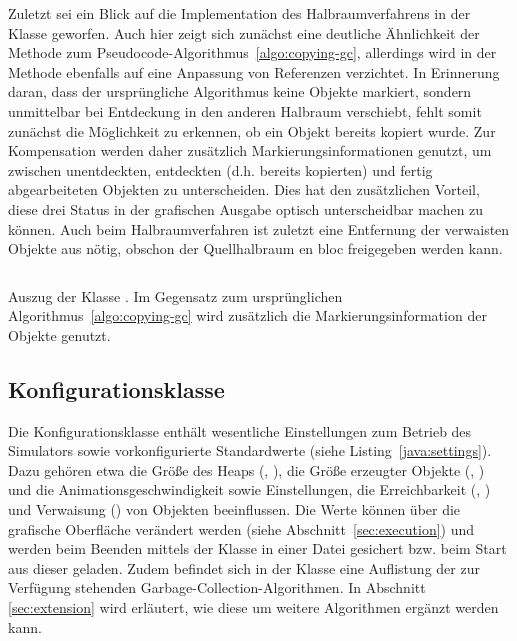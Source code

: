 Zuletzt sei ein Blick auf die Implementation des Halbraumverfahrens in der Klasse  geworfen.
Auch hier zeigt sich zunächst eine deutliche Ähnlichkeit der Methode  zum Pseudocode-Algorithmus~\ref{algo:copying-gc}, allerdings wird in der Methode  ebenfalls auf eine Anpassung von Referenzen verzichtet.
In Erinnerung daran, dass der ursprüngliche Algorithmus keine Objekte markiert, sondern unmittelbar bei Entdeckung in den anderen Halbraum verschiebt, fehlt somit zunächst die Möglichkeit zu erkennen, ob ein Objekt bereits kopiert wurde.
Zur Kompensation werden daher zusätzlich Markierungsinformationen genutzt, um zwischen unentdeckten, entdeckten (d.h. bereits kopierten) und fertig abgearbeiteten Objekten zu unterscheiden.
Dies hat den zusätzlichen Vorteil, diese drei Status in der grafischen Ausgabe optisch unterscheidbar machen zu können.
Auch beim Halbraumverfahren ist zuletzt eine Entfernung der verwaisten Objekte aus  nötig, obschon der Quellhalbraum en bloc freigegeben werden kann.

\begin{listing}[h]
	\inputminted[]{java}{code/Semispace-core.java}
	\caption[Auszug der Klasse ]{Auszug der Klasse . Im Gegensatz zum ursprünglichen Algorithmus~\ref{algo:copying-gc} wird zusätzlich die Markierungsinformation der Objekte genutzt.}
	\label{java:semispace-core}
\end{listing}

\subsection{Konfigurationsklasse }
\label{sub:settings}
Die Konfigurationsklasse  enthält wesentliche Einstellungen zum Betrieb des Simulators sowie vorkonfigurierte Standardwerte (siehe Listing~\ref{java:settings}).
Dazu gehören etwa die Größe des Heaps (, ), die Größe erzeugter Objekte (, ) und die Animationsgeschwindigkeit sowie Einstellungen, die Erreichbarkeit (, ) und Verwaisung () von Objekten beeinflussen.
Die Werte können über die grafische Oberfläche verändert werden (siehe Abschnitt~\ref{sec:execution}) und werden beim Beenden mittels der Klasse  in einer Datei  gesichert bzw. beim Start aus dieser geladen.
Zudem befindet sich in der Klasse  eine Auflistung der zur Verfügung stehenden Garbage-Collection-Algorithmen.
In Abschnitt \ref{sec:extension} wird erläutert, wie diese um weitere Algorithmen ergänzt werden kann.

